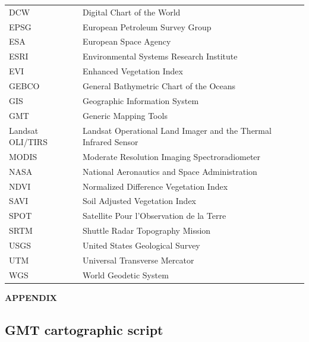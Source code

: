 \documentclass[12pt,a4paper,oneside]{article}
\def \newsection{\vspace{12pt}\textbf}
\begin{document}
\begin{tabular}{@{}ll}
DCW & Digital Chart of the World \\
EPSG & European Petroleum Survey Group \\
ESA & European Space Agency \\
ESRI & Environmental Systems Research Institute \\
EVI & Enhanced Vegetation Index \\
GEBCO & General Bathymetric Chart of the Oceans \\
GIS & Geographic Information System \\
GMT & Generic Mapping Tools \\
Landsat OLI/TIRS & Landsat Operational Land Imager and the Thermal Infrared Sensor \\
MODIS & Moderate Resolution Imaging Spectroradiometer \\
NASA & National Aeronautics and Space Administration \\
NDVI & Normalized Difference Vegetation Index \\
SAVI & Soil Adjusted Vegetation Index \\
SPOT & Satellite Pour l'Observation de la Terre \\
SRTM & Shuttle Radar Topography Mission \\
USGS & United States Geological Survey \\
UTM & Universal Transverse Mercator \\
WGS & World Geodetic System \\
\end{tabular}

\vspace{12pt}

\newsection {APPENDIX}
\vspace{12pt}

\subsection*{GMT cartographic script}
\end{document}
